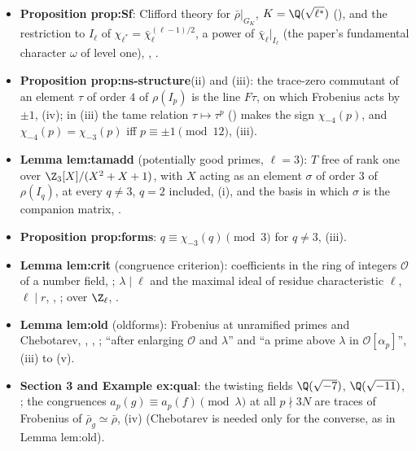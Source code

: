 \begin{itemize}
; the isomorphism $\bar\rho\simeq\bar\rho\otimes\chi_{-3}$ comes from induction from $\Q(\sqrt{-3})$, $\bar\rho\otimes\Fbar_3\simeq\Ind\psi$ with
$\Ind\psi\otimes\chi_{-3}\simeq\Ind\psi$ (), not from Frobenius traces;  gives the equivalent trace criterion
($3\mid a_p$ for almost all $p\equiv2\pmod3$), which the book uses in an example of  and the paper does not use. Lemma lem:h0 holds ``for every $E$,
with or without complex multiplication'', and its proof uses neither complex multiplication nor $a_p=0$ at inert primes (, ,
).
\item \textbf{Proposition prop:Sf}: Clifford theory for $\bar\rho|_{G_K}$, $K=\Q(\sqrt{\ell^*})$ (), and the restriction to $I_\ell$ of
$\chi_{\ell^*}=\bar\chi_\ell^{(\ell-1)/2}$, a power of $\bar\chi_\ell|_{I_\ell}$ (the paper's fundamental character $\omega$ of level one), ,
.
\item \textbf{Proposition prop:ns-structure}(ii) and (iii): the trace-zero commutant of an element $\tau$ of order $4$ of $\rho(I_p)$ is the line $F\tau$, on which
Frobenius acts by $\pm1$, (iv); in (iii) the tame relation $\tau\mapsto\tau^p$ () makes the sign $\chi_{-4}(p)$, and
$\chi_{-4}(p)=\chi_{-3}(p)$ iff $p\equiv\pm1\pmod{12}$, (iii).
\item \textbf{Lemma lem:tamadd} (potentially good primes, $\ell=3$): $T$ free of rank one over $\Z_3[X]/(X^2+X+1)$, with $X$ acting as an element $\sigma$ of order
$3$ of $\rho(I_q)$, at every $q\ne3$, $q=2$ included, (i), and the basis in which $\sigma$ is the companion matrix, .
\item \textbf{Proposition prop:forms}: $q\equiv\chi_{-3}(q)\pmod3$ for $q\ne3$, (iii).
\item \textbf{Lemma lem:crit} (congruence criterion): coefficients in the ring of integers $\mathcal O$ of a number field, ; $\lambda\mid\ell$ and the
maximal ideal of residue characteristic $\ell$, $\ell\mid r$, , ; over $\Z_\ell$, .
\item \textbf{Lemma lem:old} (oldforms): Frobenius at unramified primes and Chebotarev, , , ; ``after
enlarging $\mathcal O$ and $\lambda$'' and ``a prime above $\lambda$ in $\mathcal O[\alpha_p]$'', (iii) to (v).
\item \textbf{Section 3 and Example ex:qual}: the twisting fields $\Q(\sqrt{-7})$, $\Q(\sqrt{-11})$, ; the congruences
$a_p(g)\equiv a_p(f)\pmod\lambda$ at all $p\nmid3N$ are traces of Frobenius of $\bar\rho_g\simeq\bar\rho$, (iv) (Chebotarev is needed only
for the converse, as in Lemma lem:old).
\end{itemize}

